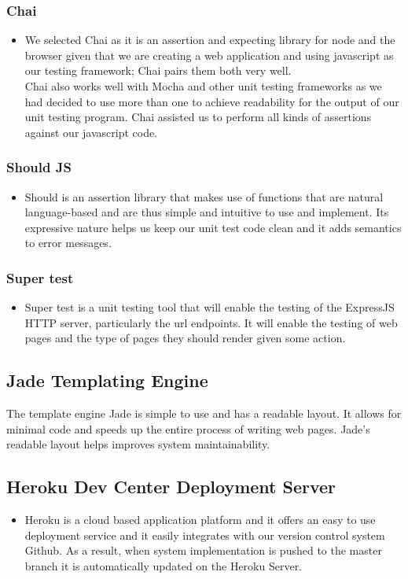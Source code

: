 \subsubsection{Chai}
\begin{itemize}
	\item We selected Chai as it is an assertion and expecting library for node and the browser given that we are
creating a web application and using javascript as our testing framework; Chai pairs them 
both very well. \\
Chai also works well with Mocha and other unit testing frameworks as we had
decided to use more than one to achieve readability for the output of our unit testing program. 
Chai assisted us to perform all kinds of assertions against our javascript code.
\end{itemize}

\subsubsection{Should JS}
\begin{itemize}
	\item Should is an assertion library that makes use of functions that are natural language-based and are thus simple and intuitive to use and implement. Its expressive nature helps us keep our unit test code clean and it adds semantics to error messages.
\end{itemize}


\subsubsection{Super test}
\begin{itemize}
	\item Super test is a unit testing tool that will enable the testing of the ExpressJS HTTP server, particularly the url endpoints. It will enable the testing of web pages and the type of pages they should render given some action.
\end{itemize}


\subsection{Jade Templating Engine}
The template engine Jade is simple to use and has a readable layout. It allows for minimal code and speeds up the entire process of writing web pages. Jade's readable layout helps improves system maintainability.


\subsection{Heroku Dev Center Deployment Server}
\begin{itemize}
	\item Heroku is a cloud based application platform and it offers an easy to use deployment service and it easily integrates with our version control system Github. As a result, when system implementation is pushed to the master branch it is automatically updated on the Heroku Server.
\end{itemize}


